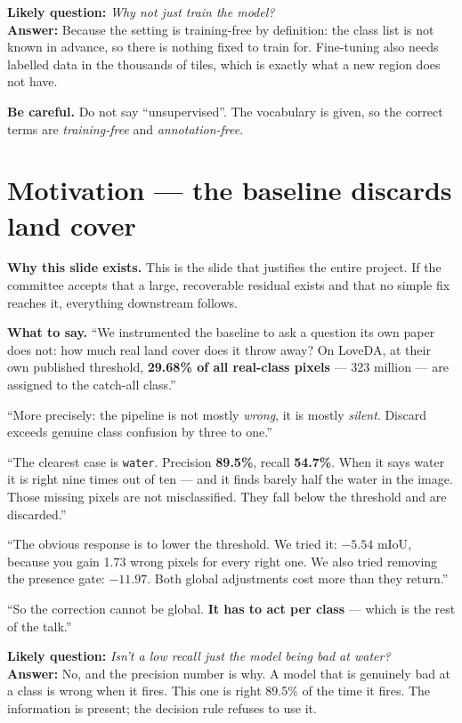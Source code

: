 \documentclass[11pt,a4paper]{article}
\newcommand{\best}[1]{\textcolor{acc}{\textbf{#1}}}
\newcommand{\bad}[1]{\textcolor{warn}{#1}}
\newcommand{\why}[1]{\par\smallskip\noindent\textbf{Why this slide exists.} #1}
\newcommand{\say}[1]{\par\smallskip\noindent\textbf{What to say.} #1}
\newcommand{\ask}[2]{\par\smallskip\noindent\textbf{Likely question:} \emph{#1}\\
  \textbf{Answer:} #2}
\newcommand{\care}[1]{\par\smallskip\noindent\bad{\textbf{Be careful.}} #1}
\begin{document}
\ask{Why not just train the model?}{Because the setting is training-free by
definition: the class list is not known in advance, so there is nothing fixed to
train for. Fine-tuning also needs labelled data in the thousands of tiles, which
is exactly what a new region does not have.}

\care{Do not say ``unsupervised''. The vocabulary is given, so the correct terms
are \emph{training-free} and \emph{annotation-free}.}

\section{Motivation --- the baseline discards land cover}
\why{This is the slide that justifies the entire project. If the committee
accepts that a large, recoverable residual exists and that no simple fix reaches
it, everything downstream follows.}

\say{``We instrumented the baseline to ask a question its own paper does not:
how much real land cover does it throw away? On LoveDA, at their own published
threshold, \best{29.68\% of all real-class pixels} --- 323 million --- are
assigned to the catch-all class.''

\smallskip
``More precisely: the pipeline is not mostly \emph{wrong}, it is mostly
\emph{silent}. Discard exceeds genuine class confusion by three to one.''

\smallskip
``The clearest case is \texttt{water}. Precision \best{89.5\%}, recall
\best{54.7\%}. When it says water it is right nine times out of ten --- and it
finds barely half the water in the image. Those missing pixels are not
misclassified. They fall below the threshold and are discarded.''

\smallskip
``The obvious response is to lower the threshold. We tried it: \bad{$-5.54$
mIoU}, because you gain 1.73 wrong pixels for every right one. We also tried
removing the presence gate: \bad{$-11.97$}. Both global adjustments cost more
than they return.''

\smallskip
``So the correction cannot be global. \best{It has to act per class} --- which is
the rest of the talk.''}

\ask{Isn't a low recall just the model being bad at water?}{No, and the precision
number is why. A model that is genuinely bad at a class is wrong when it fires.
This one is right 89.5\% of the time it fires. The information is present; the
decision rule refuses to use it.}
\end{document}
